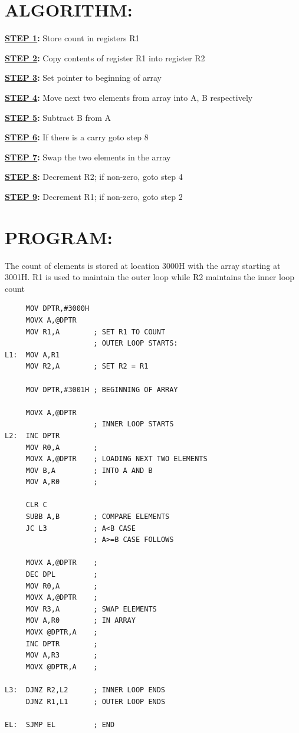 \documentclass[a4paper,28pt]{report}
\begin{document}
\section*{ALGORITHM:}
\textbf{\underline{STEP 1}:} Store count in registers R1

\textbf{\underline{STEP 2}:} Copy contents of register R1 into register R2

\textbf{\underline{STEP 3}:} Set pointer to beginning of array 

\textbf{\underline{STEP 4}:} Move next two elements from array into A, B respectively

\textbf{\underline{STEP 5}:} Subtract B from A

\textbf{\underline{STEP 6}:} If there is a carry goto step 8

\textbf{\underline{STEP 7}:} Swap the two elements in the array

\textbf{\underline{STEP 8}:} Decrement R2; if non-zero, goto step 4

\textbf{\underline{STEP 9}:} Decrement R1; if non-zero, goto step 2  
\section*{PROGRAM:}
The count of elements is stored at location 3000H with the array starting at 3001H. R1 is used to maintain the outer loop while R2 maintains the inner loop count
\begin{lstlisting}
     MOV DPTR,#3000H
     MOVX A,@DPTR
     MOV R1,A        ; SET R1 TO COUNT
                     ; OUTER LOOP STARTS:
L1:  MOV A,R1
     MOV R2,A        ; SET R2 = R1
     
     MOV DPTR,#3001H ; BEGINNING OF ARRAY
     
     MOVX A,@DPTR
                     ; INNER LOOP STARTS
L2:  INC DPTR 
     MOV R0,A        ;
     MOVX A,@DPTR    ; LOADING NEXT TWO ELEMENTS
     MOV B,A         ; INTO A AND B 
     MOV A,R0        ;
     
     CLR C
     SUBB A,B        ; COMPARE ELEMENTS
     JC L3           ; A<B CASE
                     ; A>=B CASE FOLLOWS
            
     MOVX A,@DPTR    ;
     DEC DPL         ;
     MOV R0,A        ;
     MOVX A,@DPTR    ; 
     MOV R3,A        ; SWAP ELEMENTS
     MOV A,R0        ; IN ARRAY
     MOVX @DPTR,A    ;
     INC DPTR        ;
     MOV A,R3        ;
     MOVX @DPTR,A    ;
     
L3:  DJNZ R2,L2      ; INNER LOOP ENDS
     DJNZ R1,L1      ; OUTER LOOP ENDS
     
EL:  SJMP EL         ; END
\end{lstlisting}
\end{document}
